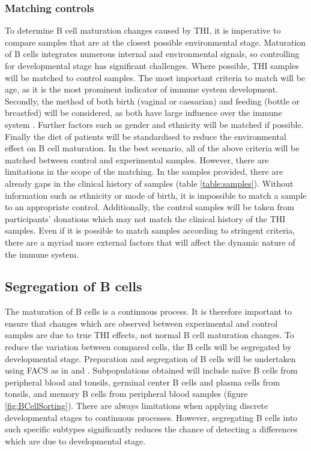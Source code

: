 \documentclass[12pt]{article}
\newcommand{\naive}{na\"{i}ve }
\begin{document}
			\subsubsection{Matching controls} 
			
				To determine B cell maturation changes caused by THI, it is imperative to compare samples that are at the closest possible environmental stage.
				Maturation of B cells integrates numerous internal and environmental signals, so controlling for developmental stage has significant challenges. 
				Where possible, THI samples will be matched to control samples. 
				The most important criteria to match will be age, as it is the most prominent indicator of immune system development. 
				Secondly, the method of both birth (vaginal or caesarian) and feeding (bottle or breastfed) will be considered, as both have large influence over the immune system \citep{Jakobsson14,Cho13,Brandtzaeg03,Rogier14,Gomez14}.
				Further factors such as gender and ethnicity will be matched if possible. 
				Finally the diet of patients will be standardised to reduce the environmental effect on B cell maturation.
				In the best scenario, all of the above criteria will be matched between control and experimental samples. 
				However, there are limitations in the scope of the matching. 
				In the samples provided, there are already gaps in the clinical history of samples (table \ref{table:samples}). 
				Without information such as ethnicity or mode of birth, it is impossible to match a sample to an appropriate control. 
				Additionally, the control samples will be taken from participants' donations which may not match the clinical history of the THI samples.
				Even if it is possible to match samples according to stringent criteria, there are a myriad more external factors that will affect the dynamic nature of the immune system.
				 
				
		
		\subsection{Segregation of B cells}
			
			The maturation of B cells is a continuous process. 
			It is therefore important to ensure that changes which are observed between experimental and control samples are due to true THI effects, not normal B cell maturation changes.
			To reduce the variation between compared cells, the B cells will be segregated by developmental stage. 
			Preparation and segregation of B cells will be undertaken using FACS as in \citet{Kulis15} and \citet{Oakes16}.
			Subpopulations obtained will include \naive B cells from peripheral blood and tonsils, germinal center B cells and plasma cells from tonsils, and memory B cells from peripheral blood samples (figure \ref{fig:BCellSorting}). 
			There are always limitations when applying discrete developmental stages to continuous processes.
			However, segregating B cells into such specific subtypes significantly reduces the chance of detecting a differences which are due to developmental stage. 
			
\end{document}
